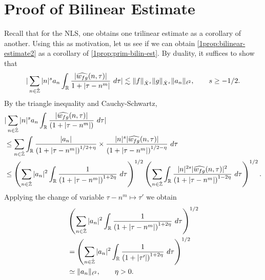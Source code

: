 \section{Proof of Bilinear Estimate}
Recall that for the NLS, one obtains one trilinear estimate as a corollary of
another. Using this as motivation, let us see if we can obtain
\cref{1prop:bilinear-estimate2} as a corollary of
\cref{1prop:prim-bilin-est}. By
duality, it suffices to show that
%
\begin{equation}
	\label{1duality-est}
	\begin{split}
	|	\sum_{n \in \dot{\mathbb{Z}}}  |n|^{s}
		a_n \int_{\mathbb{R}} \frac{|\widehat{w_{fg}}(n, \tau)|}{1 
		+ | \tau - n^m |} \ d \tau | \lesssim \|f\|_{\dot{X}^s} \|g\|_{\dot{X}^s}
		\|a_n \|_{\ell^2}, \qquad s \ge -1/2.
	\end{split}
\end{equation}
%
By the triangle inequality 
and Cauchy-Schwartz,
%
\begin{equation}
	\label{11m}
	\begin{split}
		& | \sum_{n \in \dot{\mathbb{Z}}} |n|^{s} a_n
		\int_{\mathbb{R}}\frac{| \widehat{w_{fg}}(n, \tau) |}{(1 + | \tau - n^m |)} \ d \tau |
		\\
		& \le \sum_{n \in \dot{\mathbb{Z}}} \int_{\mathbb{R}} \frac{| a_n |}{\left( 1 + 
		| \tau - n^m |
		\right)^{1/2 + \eta}} \times \frac{| n|^s  |
		\widehat{w_{fg}}(n, \tau) |}{\left( 
		1 + | \tau - n^m | \right)^{1/2 - \eta}} \ d \tau
		\\
		& \le \left( \sum_{n \in \dot{\mathbb{Z}}} | a_{n} |^2\int_{\mathbb{R}} \frac{1}{\left( 1 + |
		\tau - n^m | \right)^{1 + 2 \eta}} \ d \tau  
		\right)^{1/2} 
		\left ( \sum_{n \in \dot{\mathbb{Z}}}\int_{\mathbb{R}} \frac{|n|^{2s} | \widehat{w_{fg}}(n, \tau) 
		|^2}{\left( 1 + | \tau - n^m | \right)^{1 -2 \eta}}\ d \tau 
		\right)^{1/2}.
	\end{split}
\end{equation}
%
Applying the change of variable $\tau - n^m
\mapsto \tau'$ we obtain  
%
\begin{equation*}
	\begin{split}
		& \left( \sum_{n \in \zzdot} | a_{n} |^2\int_{\rr} \frac{1}{\left( 1 + | \tau -
		n^m | \right)^{1 + 2 \eta}} \ d \tau  
		\right)^{1/2} 
		\\
		& = \left ( \sum_{n \in \zzdot}
		| a_n |^2 
		\int_{\rr} \frac{1}{\left( 1 + | \tau' | \right)^{1 + 2 \eta}} \ d 
		\tau \right)^{1/2}
		\\
		& \simeq \|a_n\|_{\ell^2}, \qquad \eta >0.
		\end{split}
\end{equation*}
